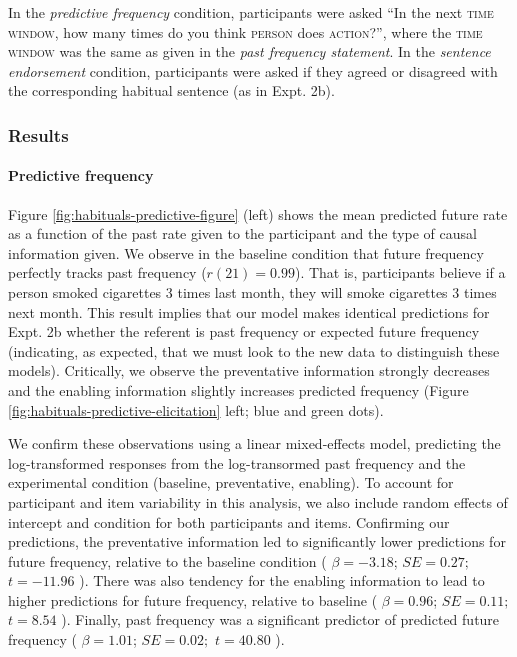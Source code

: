 \documentclass[english,floatsintext,man]{apa6}
\theoremstyle{definition}
\theoremstyle{definition}
\theoremstyle{definition}
\theoremstyle{remark}
\begin{document}
In the \emph{predictive frequency} condition, participants were asked
``In the next \textsc{time window}, how many times do you think
\textsc{person} does \textsc{action}?'', where the \textsc{time window}
was the same as given in the \emph{past frequency statement}. In the
\emph{sentence endorsement} condition, participants were asked if they
agreed or disagreed with the corresponding habitual sentence (as in
Expt. 2b).

\subsubsection{Results}\label{results-3}

\paragraph{Predictive frequency}\label{predictive-frequency}

Figure \ref{fig:habituals-predictive-figure} (left) shows the mean
predicted future rate as a function of the past rate given to the
participant and the type of causal information given. We observe in the
baseline condition that future frequency perfectly tracks past frequency
(\(r(21) = 0.99\)). That is, participants believe if a person smoked
cigarettes 3 times last month, they will smoke cigarettes 3 times next
month. This result implies that our model makes identical predictions
for Expt. 2b whether the referent is past frequency or expected future
frequency (indicating, as expected, that we must look to the new data to
distinguish these models). Critically, we observe the preventative
information strongly decreases and the enabling information slightly
increases predicted frequency (Figure
\ref{fig:habituals-predictive-elicitation} left; blue and green dots).

We confirm these observations using a linear mixed-effects model,
predicting the log-transformed responses from the log-transormed past
frequency and the experimental condition (baseline, preventative,
enabling). To account for participant and item variability in this
analysis, we also include random effects of intercept and condition for
both participants and items. Confirming our predictions, the
preventative information led to significantly lower predictions for
future frequency, relative to the baseline condition (
\(\beta = -3.18\); \(SE = 0.27;\) \(t = -11.96\) ). There was also
tendency for the enabling information to lead to higher predictions for
future frequency, relative to baseline ( \(\beta = 0.96\);
\(SE = 0.11;\) \(t = 8.54\) ). Finally, past frequency was a significant
predictor of predicted future frequency ( \(\beta = 1.01\);
\(SE = 0.02;\) \(t = 40.80\) ).
\end{document}
